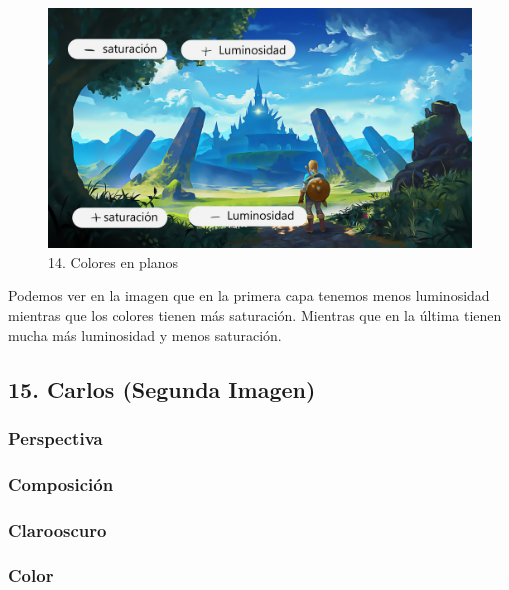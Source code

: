 \documentclass[12pt]{article}
\begin{document}
    \begin{figure}[H]
      \centering
      \includegraphics[scale=0.35]{images/Selena/14_concept_art r.jpg}
      \caption{\small 14. Colores en planos}
    \end{figure}
    Podemos ver en la imagen que en la primera capa tenemos menos luminosidad mientras que los colores tienen más saturación. Mientras que en la última tienen mucha más luminosidad y menos saturación.

        \newpage


    \subsection{15. Carlos (Segunda Imagen)}
        \subsubsection{Perspectiva}

        \subsubsection{Composición}

        \subsubsection{Clarooscuro}

        \subsubsection{Color}
        \newpage
\end{document}
